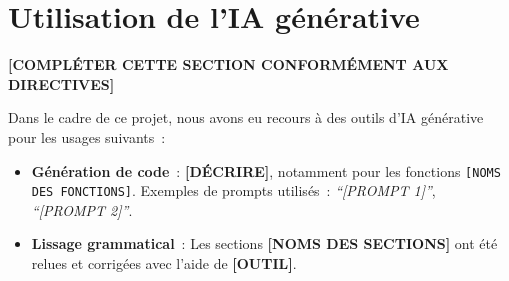 \documentclass[conference]{IEEEtran}
\begin{document}
\section{Utilisation de l'IA générative}

\textbf{[COMPLÉTER CETTE SECTION CONFORMÉMENT AUX DIRECTIVES]}

Dans le cadre de ce projet, nous avons eu recours à des outils d'IA générative pour les
usages suivants~:

\begin{itemize}
  \item \textbf{Génération de code}~: \textbf{[DÉCRIRE]}, notamment pour les fonctions
        \texttt{[NOMS DES FONCTIONS]}. Exemples de prompts utilisés~: \textit{``[PROMPT 1]''},
        \textit{``[PROMPT 2]''}.
  \item \textbf{Lissage grammatical}~: Les sections \textbf{[NOMS DES SECTIONS]} ont été
        relues et corrigées avec l'aide de \textbf{[OUTIL]}.
\end{itemize}




\end{document}
